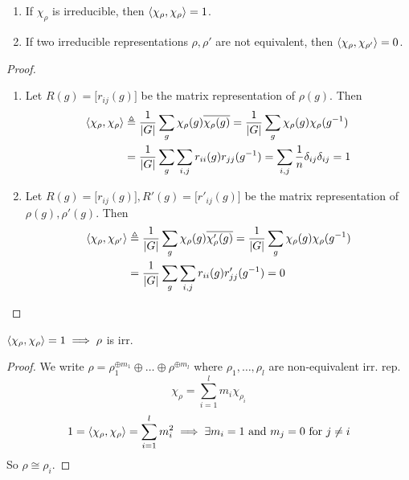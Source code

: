 \begin{prop} \mbox{}
  \begin{enumerate}
    \item If $\chi_\rho$ is irreducible, then $\langle\chi_\rho, \chi_\rho\rangle = 1$.
    \item If two irreducible representations $\rho, \rho'$ are not equivalent, then
      $\langle\chi_\rho, \chi_{\rho'}\rangle = 0$.
  \end{enumerate}

  \begin{proof} \mbox{}
    \begin{enumerate}
      \item
        Let $R(g) = \big[ r_{ij}(g) \big]$ be the matrix representation of $\rho(g)$. Then
        \begin{align*}
          \langle\chi_\rho, \chi_{\rho}\rangle &\triangleq \frac{1}{\lvert G\rvert} \sum_g \chi_\rho(g)
          \overline{\chi_\rho(g)} = \frac{1}{\lvert G\rvert} \sum_g \chi_\rho(g) \chi_\rho(g^{-1}) \\
          &= \frac{1}{\lvert G\rvert} \sum_g \sum_{i, j} r_{ii}(g) r_{jj}(g^{-1})
          = \sum_{i, j} \frac{1}{n} \delta_{ij} \delta_{ij} = 1
        \end{align*}
      \item
        Let $R(g) = \big[ r_{ij}(g) \big], R'(g) = \big[ r'_{ij}(g) \big]$
        be the matrix representation of $\rho(g), \rho'(g)$. Then
        \begin{align*}
          \langle\chi_\rho, \chi_{\rho'}\rangle
          &\triangleq \frac{1}{\lvert G\rvert} \sum_g \chi_\rho(g) \overline{\chi_\rho'(g)}
          = \frac{1}{\lvert G\rvert} \sum_g \chi_\rho(g) \chi_\rho(g^{-1}) \\
          &= \frac{1}{\lvert G\rvert} \sum_g \sum_{i, j} r_{ii}(g) r'_{jj}(g^{-1})
          = 0
        \end{align*}
    \end{enumerate}
  \end{proof}
\end{prop}

\begin{remark}
  $\langle\chi_\rho,\chi_\rho\rangle = 1 \implies \rho$ is irr.
  \begin{proof}
    We write $\rho = \rho_1^{\oplus m_1}\oplus\dots\oplus\rho^{\oplus m_l}$
    where $\rho_1, \dots, \rho_l$ are non-equivalent irr. rep.
    \[ \chi_\rho = \sum_{i=1}^l m_i \chi_{\rho_i} \]
    \[
      1 = \langle\chi_\rho, \chi_\rho\rangle = \sum_{i=1}^l m_i^2
      \implies \exists m_i = 1 \text{~and~} m_j = 0 \text{~for~} j \ne i
    \]
    So $\rho \cong \rho_i$.
  \end{proof}
\end{remark}
